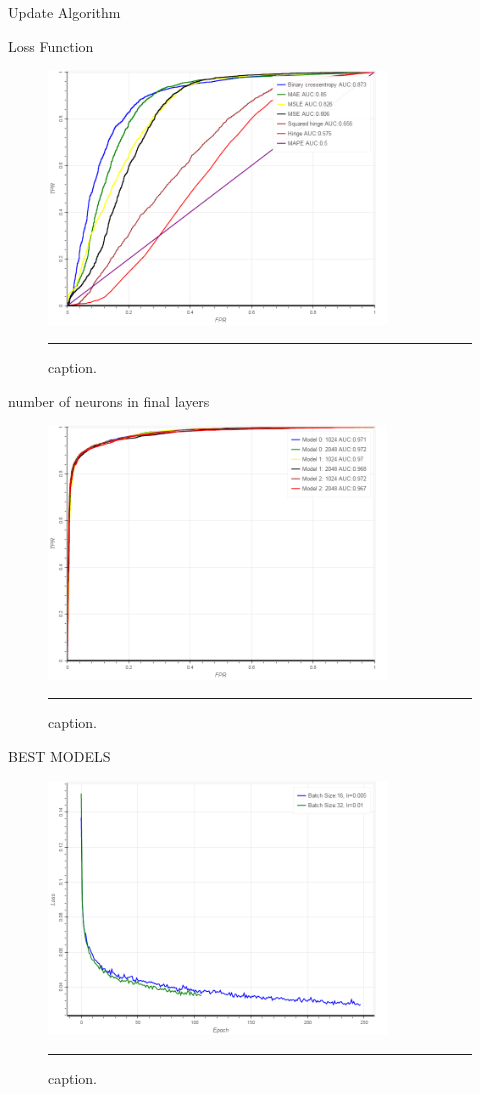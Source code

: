   Update Algorithm

  Loss Function
\begin{figure}[htbp]
  \centering
    \includegraphics[width = 0.8\textwidth]{./Figures/AUC_loss_functions.png}
    \rule{35em}{0.5pt}
  \caption[Loss Functions]{caption.}
  \label{fig:}
\end{figure}


  number of neurons in final layers
\begin{figure}[htbp]
  \centering
    \includegraphics[width = 0.8\textwidth]{./Figures/AUC_final_neurons.png}
    \rule{35em}{0.5pt}
  \caption[Last Hidden Layers]{caption.}
  \label{fig:}
\end{figure}


BEST MODELS
\begin{figure}[htbp]
  \centering
    \includegraphics[width = 0.8\textwidth]{./Figures/training_slow_mdl0.png}
    \rule{35em}{0.5pt}
  \caption[Slow Training]{caption.}
  \label{fig:}
\end{figure}

